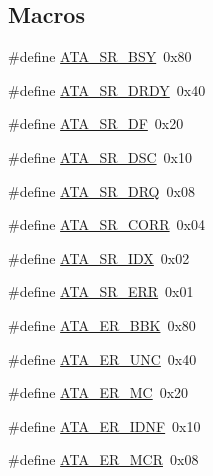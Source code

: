 \subsection*{Macros}
\begin{DoxyCompactItemize}
\item 
\#define \hyperlink{a00005_aed1929007f388cab23229c908be5bbaf_aed1929007f388cab23229c908be5bbaf}{A\+T\+A\+\_\+\+S\+R\+\_\+\+B\+SY}~0x80
\item 
\#define \hyperlink{a00005_a51b4023132fbdc98d4498bd8e21d064d_a51b4023132fbdc98d4498bd8e21d064d}{A\+T\+A\+\_\+\+S\+R\+\_\+\+D\+R\+DY}~0x40
\item 
\#define \hyperlink{a00005_aca73201ed93e5c9d9d9fbf51270fde0b_aca73201ed93e5c9d9d9fbf51270fde0b}{A\+T\+A\+\_\+\+S\+R\+\_\+\+DF}~0x20
\item 
\#define \hyperlink{a00005_a2317ad830d33431eb1222a4079d6dab2_a2317ad830d33431eb1222a4079d6dab2}{A\+T\+A\+\_\+\+S\+R\+\_\+\+D\+SC}~0x10
\item 
\#define \hyperlink{a00005_a27e6aaa78aaaa205a7dadf56b48d0bf6_a27e6aaa78aaaa205a7dadf56b48d0bf6}{A\+T\+A\+\_\+\+S\+R\+\_\+\+D\+RQ}~0x08
\item 
\#define \hyperlink{a00005_a7cb0243beb875711e6b46cda0be7c53a_a7cb0243beb875711e6b46cda0be7c53a}{A\+T\+A\+\_\+\+S\+R\+\_\+\+C\+O\+RR}~0x04
\item 
\#define \hyperlink{a00005_ad74934afc699945311360be6e3700ef5_ad74934afc699945311360be6e3700ef5}{A\+T\+A\+\_\+\+S\+R\+\_\+\+I\+DX}~0x02
\item 
\#define \hyperlink{a00005_a8a2cf843df1ae63d4d16748dfe72a592_a8a2cf843df1ae63d4d16748dfe72a592}{A\+T\+A\+\_\+\+S\+R\+\_\+\+E\+RR}~0x01
\item 
\#define \hyperlink{a00005_a97e6940186e5f1cfe5c501e56312de45_a97e6940186e5f1cfe5c501e56312de45}{A\+T\+A\+\_\+\+E\+R\+\_\+\+B\+BK}~0x80
\item 
\#define \hyperlink{a00005_ab1e1938e0fc8f511102b778956aa3bd4_ab1e1938e0fc8f511102b778956aa3bd4}{A\+T\+A\+\_\+\+E\+R\+\_\+\+U\+NC}~0x40
\item 
\#define \hyperlink{a00005_aaed40c458ad34dae2d82381e71e372ac_aaed40c458ad34dae2d82381e71e372ac}{A\+T\+A\+\_\+\+E\+R\+\_\+\+MC}~0x20
\item 
\#define \hyperlink{a00005_a6bed47f17f64ab98da1dd946ca123198_a6bed47f17f64ab98da1dd946ca123198}{A\+T\+A\+\_\+\+E\+R\+\_\+\+I\+D\+NF}~0x10
\item 
\#define \hyperlink{a00005_af5f476aa2920211197aa8ff81f0dfdbd_af5f476aa2920211197aa8ff81f0dfdbd}{A\+T\+A\+\_\+\+E\+R\+\_\+\+M\+CR}~0x08

\end{DoxyCompactItemize}
